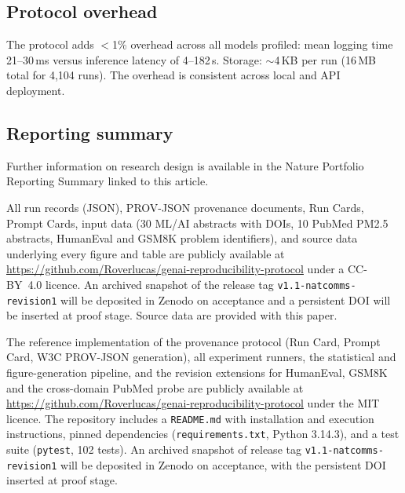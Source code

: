 \documentclass[sn-nature]{sn-jnl}
\begin{document}
\subsection{Protocol overhead}\label{subsec:overhead}

The protocol adds $<$1\% overhead across all models profiled: mean logging time 21--30\,ms versus inference latency of 4--182\,s.
Storage: $\sim$4\,KB per run (16\,MB total for 4,104 runs).
The overhead is consistent across local and API deployment.


\subsection{Reporting summary}\label{subsec:reporting}

Further information on research design is available in the Nature Portfolio Reporting Summary linked to this article.


\backmatter


All run records (JSON), PROV-JSON provenance documents, Run Cards, Prompt Cards, input data (30 ML/AI abstracts with DOIs, 10 PubMed PM2.5 abstracts, HumanEval and GSM8K problem identifiers), and source data underlying every figure and table are publicly available at \url{https://github.com/Roverlucas/genai-reproducibility-protocol} under a CC-BY~4.0 licence. An archived snapshot of the release tag \texttt{v1.1-natcomms-revision1} will be deposited in Zenodo on acceptance and a persistent DOI will be inserted at proof stage. Source data are provided with this paper.


The reference implementation of the provenance protocol (Run Card, Prompt Card, W3C PROV-JSON generation), all experiment runners, the statistical and figure-generation pipeline, and the revision extensions for HumanEval, GSM8K and the cross-domain PubMed probe are publicly available at \url{https://github.com/Roverlucas/genai-reproducibility-protocol} under the MIT licence. The repository includes a \texttt{README.md} with installation and execution instructions, pinned dependencies (\texttt{requirements.txt}, Python 3.14.3), and a test suite (\texttt{pytest}, 102 tests). An archived snapshot of release tag \texttt{v1.1-natcomms-revision1} will be deposited in Zenodo on acceptance, with the persistent DOI inserted at proof stage.
\end{document}
